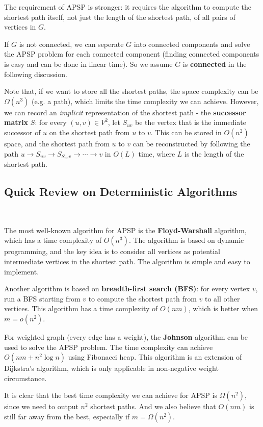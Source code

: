 \documentclass[11pt]{article}
\theoremstyle{plain}
\begin{document}
The requirement of APSP is stronger: it requires the algorithm to compute the shortest path itself, not just the length of the shortest path, of all pairs of vertices in $G$. 

If $G$ is not connected, we can seperate $G$ into connected components and solve the APSP problem for each connected component (finding connected components is easy and can be done in linear time). So we assume $G$ is \textbf{connected} in the following discussion.

Note that, if we want to store all the shortest paths, the space complexity can be $\Omega(n^3)$ (e.g. a path), which limits the time complexity we can achieve. However, we can record an \emph{implicit} representation of the shortest path - the \textbf{successor matrix} $S$: for every $(u,v)\in V^2$, let $S_{uv}$ be the vertex that is the immediate successor of $u$ on the shortest path from $u$ to $v$. This can be stored in $O(n^2)$ space, and the shortest path from $u$ to $v$ can be reconstructed by following the path $u\to S_{uv}\to S_{S_{uv}v}\to\cdots\to v$ in $O(L)$ time, where $L$ is the length of the shortest path.

\subsection{Quick Review on Deterministic Algorithms}\

The most well-known algorithm for APSP is the \textbf{Floyd-Warshall} algorithm, which has a time complexity of $O(n^3)$. The algorithm is based on dynamic programming, and the key idea is to consider all vertices as potential intermediate vertices in the shortest path. The algorithm is simple and easy to implement.

Another algorithm is based on \textbf{breadth-first search (BFS)}: for every vertex $v$, run a BFS starting from $v$ to compute the shortest path from $v$ to all other vertices. This algorithm has a time complexity of $O(nm)$, which is better when $m=o(n^2)$.

For weighted graph (every edge has a weight), the \textbf{Johnson} algorithm can be used to solve the APSP problem. The time complexity can achieve $O(nm+n^2\log n)$ using Fibonacci heap. This algorithm is an extension of Dijkstra's algorithm, which is only applicable in non-negative weight circumstance. 

It is clear that the best time complexity we can achieve for APSP is $\Omega(n^2)$, since we need to output $n^2$ shortest paths. And we also believe that $O(nm)$ is still far away from the best, especially if $m=\Omega(n^2)$.
\end{document}
